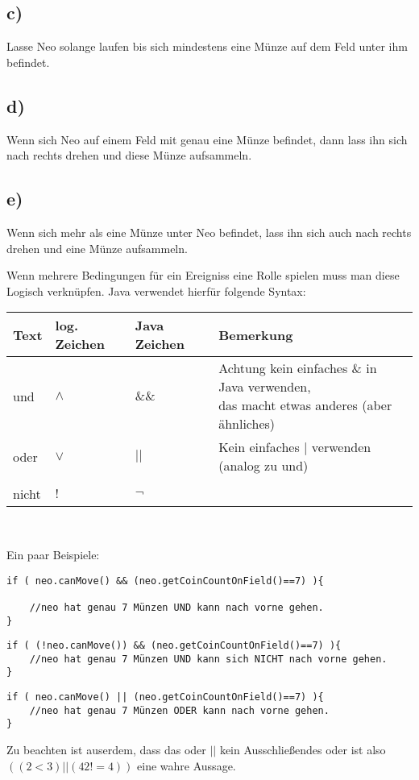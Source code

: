 	\subsection*{c)}
	Lasse Neo solange laufen bis sich mindestens eine Münze auf dem Feld unter ihm befindet.
	\subsection*{d)}
	Wenn sich Neo auf einem Feld mit genau eine Münze befindet, dann lass ihn sich nach rechts drehen und diese Münze aufsammeln.
	\subsection*{e)}
	Wenn sich mehr als eine Münze unter Neo befindet, lass ihn sich auch nach rechts drehen und eine Münze aufsammeln.


\begin{Infobox}
Wenn mehrere Bedingungen für ein Ereigniss eine Rolle spielen muss man diese Logisch verknüpfen. Java verwendet hierfür folgende Syntax:
\begin{center}
        \begin{tabular}{ l | l | l | l}
            Text & log. Zeichen & Java Zeichen &Bemerkung \\
            \hline
            und  &$\land$& $\&\&$& \minibox{Achtung kein einfaches \& in Java verwenden,\\ das macht etwas anderes (aber ähnliches)} \\
            oder  &$\lor$& $||$& Kein einfaches $|$ verwenden (analog zu und) \\
            & &  \\

            nicht & $!$&$\neg$ &\\
    \end{tabular}\\
\end{center}
Ein paar Beispiele:
\begin{lstlisting}
if ( neo.canMove() && (neo.getCoinCountOnField()==7) ){

	//neo hat genau 7 Münzen UND kann nach vorne gehen.
}
\end{lstlisting}

\begin{lstlisting}
if ( (!neo.canMove()) && (neo.getCoinCountOnField()==7) ){
	//neo hat genau 7 Münzen UND kann sich NICHT nach vorne gehen.
}
\end{lstlisting}

\begin{lstlisting}
if ( neo.canMove() || (neo.getCoinCountOnField()==7) ){
	//neo hat genau 7 Münzen ODER kann nach vorne gehen.
}
\end{lstlisting}
Zu beachten ist auserdem, dass das oder $||$ kein Ausschließendes oder ist also\\ $((2 < 3) || (42 != 4))$ eine wahre Aussage.
\end{Infobox}
